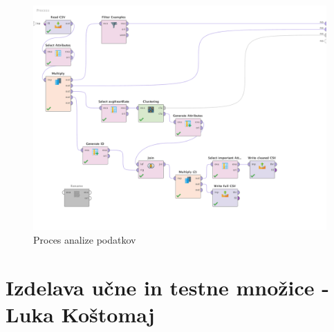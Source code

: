 \documentclass[a4paper,11pt]{article}
\begin{document}
\begin{figure}[H]
\caption{Proces analize podatkov}
\centering
\includegraphics[width=1\textwidth]{IntensityClusteringProcess}
\end{figure}


\newpage
\section{Izdelava učne in testne množice - Luka Koštomaj}
\end{document}
